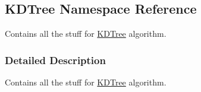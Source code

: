 \hypertarget{namespaceKDTree}{
\subsection{KDTree Namespace Reference}
\label{namespaceKDTree}
}
Contains all the stuff for \hyperlink{namespaceKDTree}{KDTree} algorithm.  




\subsubsection{Detailed Description}
Contains all the stuff for \hyperlink{namespaceKDTree}{KDTree} algorithm. 


